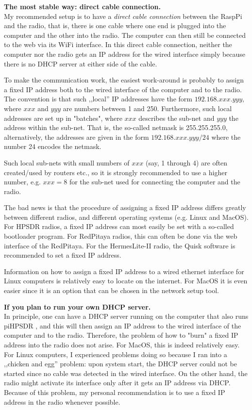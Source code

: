 \documentclass[12pt]{book}
\def\pH{pi\-HPSDR }
\begin{document}
\textbf{The most stable way: direct cable connection.}\\
My recommended setup is to have a \textit{direct cable connection} between the RaspPi and the radio, that
is, there is one cable where one end is plugged into the computer and the other into the radio. The computer
can then still be connected to the web via its WiFi interface. In this direct cable connection, neither
the computer nor the radio gets an IP address for the wired interface simply because there is no DHCP server
at either side of the cable.

To make the communication work, the easiest work-around is probably to assign a fixed IP address both to
the wired interface of the computer and to the radio. The convention is that such ,,local'' IP addresses have
the form $192.168.xxx.yyy$, where $xxx$ and $yyy$ are numbers between 1 and 250. Furthermore, such
local addresses are set up in "batches", where $xxx$ describes the sub-net and $yyy$ the address within the
sub-net. That is, the so-called netmask is 255.255.255.0, alternatively, the addresses are given in the
form $192.168.xxx.yyy/24$ where the number 24 encodes the netmask.

Such local sub-nets with small numbers of $xxx$ (say, 1 through 4) are often created/used by routers etc.,
so it is strongly recommended to use a higher number, e.g. $xxx=8$ for the sub-net used for connecting
the computer and the radio.

The bad news is that the procedure of assigning a fixed IP address differs greatly between different
radios, and different operating systems (e.g. Linux and MacOS). For HPSDR radios, a fixed IP address
can most easily be set with a so-called bootloader program. For RedPitaya radios, this can often
be done via the web interface of the RedPitaya. For the HermesLite-II radio, the Quisk software
is recommended to set a fixed IP address.

Information on how to assign a fixed IP address to a wired ethernet interface for Linux computers
is relatively easy to locate on the internet. For MacOS it is even easier since it is an option that
can be chosen in the network setup tool.

\textbf{If you plan to run your own DHCP server.}\\
In principle, one can have a DHCP server running on the computer that also runs \pH, and this
will then assign an IP address to the wired interface of the computer and to the
radio. Therefore, the problem of how to "burn" a fixed IP address into the radio does not arise. For MacOS, this
is indeed relatively easy. For Linux computers, I experienced problems doing so because I ran into a
,,chicken and egg'' problem: upon system start, the DHCP server could not be started since no cable was
detected in the wired interface. On the other hand, the radio might activate its interface only after
it gets an IP address via DHCP. Because of this problem, my personal recommendation is to use a fixed
IP address in the radio whenever possible.
\end{document}

